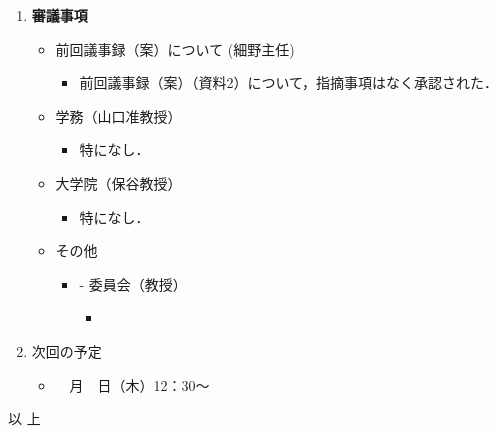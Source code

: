 \documentclass[10.5pt,a4paper]{jsarticle}
\begin{document}
\begin{enumerate}[label=\arabic*：, leftmargin=2zw, labelsep=1zw, itemsep=1\baselineskip]
 \item \textbf{審議事項}
	\begin{itemize}[label=・, leftmargin=1.5zw, itemsep=1\baselineskip]%
		\item 前回議事録（案）について (細野主任)
		\begin{itemize}[label=-, leftmargin=2zw, nosep]
			\item 前回議事録（案）（資料2）について，指摘事項はなく承認された．
		\end{itemize}
		
		\item 学務（山口准教授）
		\begin{itemize}[label=-, leftmargin=2zw, nosep]
			\item 特になし．
		\end{itemize}
		
		\item 大学院（保谷教授）
		\begin{itemize}[label=-, leftmargin=2zw, nosep]
			\item 特になし．

		\end{itemize}

		\item その他
		\begin{itemize}[label=-, leftmargin=2zw, nosep]
			\item -	委員会（教授）
			\begin{itemize}
				\item 
			\end{itemize}

		\end{itemize}
	\end{itemize}

	\item 次回の予定
	\begin{itemize}[label=・, leftmargin=1.5zw, nosep]
		\item 　月　日（木）12：30〜
	\end{itemize}

\end{enumerate}

\begin{flushright}
以  上
\end{flushright}
\end{document}
